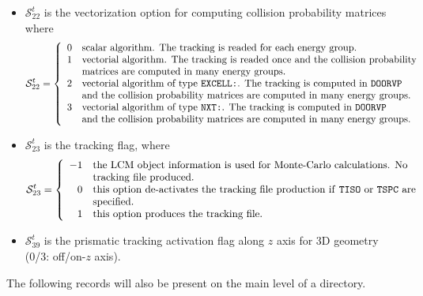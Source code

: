 \begin{itemize}
\item $\mathcal{S}^{t}_{22}$ is the vectorization option for computing collision probability matrices where
\begin{displaymath}
\mathcal{S}^{t}_{22} = \left\{
\begin{array}{rl}
 0 & \textrm{scalar algorithm. The tracking is readed for each energy group.} \\
 1 & \textrm{vectorial algorithm. The tracking is readed once and the collision
 probability} \\
   & \textrm{matrices are computed in many energy groups.} \\
 2 & \textrm{vectorial algorithm of type \moc{EXCELL:}. The tracking is computed in \moc{DOORVP}} \\
   & \textrm{and the collision probability matrices are computed in many energy groups.} \\
 3 & \textrm{vectorial algorithm of type \moc{NXT:}. The tracking is computed in \moc{DOORVP}} \\
   & \textrm{and the collision probability matrices are computed in many energy groups.} \\
\end{array} \right.
\end{displaymath}

\item $\mathcal{S}^{t}_{23}$ is the tracking flag, where
\begin{displaymath}
\mathcal{S}^{t}_{23} = \left\{
\begin{array}{rl}
 -1 & \textrm{the LCM object information is used for Monte-Carlo calculations. No} \\
   & \textrm{tracking file produced.} \\
 0 & \textrm{this option de-activates the tracking file production if \moc{TISO} or \moc{TSPC} are} \\
   & \textrm{specified.} \\
 1 & \textrm{this option produces the tracking file.} \\
\end{array} \right.
\end{displaymath}

\item $\mathcal{S}^{t}_{39}$ is the prismatic tracking activation flag along $z$ axis for 3D geometry (0/3: off/on-$z$ axis).

\end{itemize}

The following records will also be present on the main level of a 
directory.

